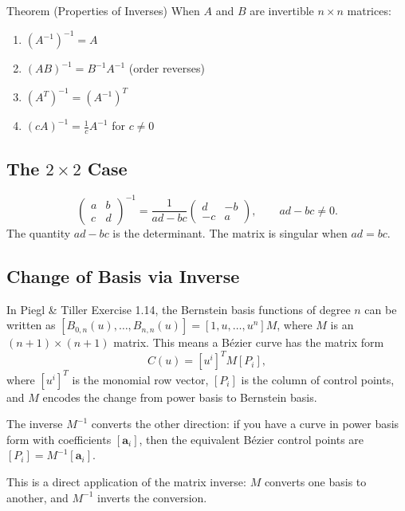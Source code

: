\begin{theorembox}{Theorem (Properties of Inverses)}
When $A$ and $B$ are invertible $n \times n$ matrices:
\begin{enumerate}
  \item $(A^{-1})^{-1} = A$
  \item $(AB)^{-1} = B^{-1}A^{-1}$ \quad (order reverses)
  \item $(A^T)^{-1} = (A^{-1})^T$
  \item $(cA)^{-1} = \tfrac{1}{c} A^{-1}$ for $c \neq 0$
\end{enumerate}
\end{theorembox}

\subsection*{The $2 \times 2$ Case}

\begin{tcolorbox}[colback=gray!6, colframe=gray!40, arc=2pt,
  left=6pt, right=6pt, top=4pt, bottom=4pt,
  title={\small\textbf{Formula ($2 \times 2$ Inverse)}},
  fonttitle=\small\bfseries]
\[
  \begin{pmatrix} a & b \\ c & d \end{pmatrix}^{-1}
  = \frac{1}{ad - bc} \begin{pmatrix} d & -b \\ -c & a \end{pmatrix},
  \qquad ad - bc \neq 0.
\]
The quantity $ad - bc$ is the determinant. The matrix is singular when $ad = bc$.
\end{tcolorbox}

\subsection*{Change of Basis via Inverse}

\begin{remark*}
In Piegl \& Tiller Exercise 1.14, the Bernstein basis functions of degree $n$
can be written as $[B_{0,n}(u), \ldots, B_{n,n}(u)] = [1, u, \ldots, u^n] M$,
where $M$ is an $(n+1) \times (n+1)$ matrix.
This means a Bézier curve has the matrix form
\[
  C(u) = [u^i]^T M [P_i],
\]
where $[u^i]^T$ is the monomial row vector, $[P_i]$ is the column of control points,
and $M$ encodes the change from power basis to Bernstein basis.

The inverse $M^{-1}$ converts the other direction: if you have a curve in
power basis form with coefficients $[\mathbf{a}_i]$, then the equivalent
Bézier control points are $[P_i] = M^{-1}[\mathbf{a}_i]$.

This is a direct application of the matrix inverse: $M$ converts one basis
to another, and $M^{-1}$ inverts the conversion.
\end{remark*}
